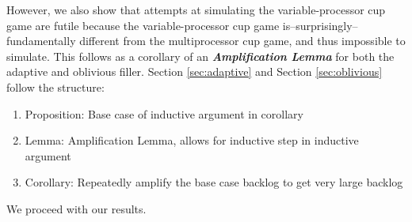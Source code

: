 \documentclass[twocolumn]{article}[11pt]
\newcommand{\defn}[1]{{\textit{\textbf{\boldmath #1}}}}
\begin{document}
However, we also show that attempts at simulating the variable-processor cup
game are futile because the variable-processor cup game
is--surprisingly--fundamentally different from the multiprocessor cup game, and
thus impossible to simulate. This follows as a corollary of an
\defn{Amplification Lemma} for both the adaptive and oblivious filler.
Section \ref{sec:adaptive} and Section \ref{sec:oblivious} follow the structure:
\begin{enumerate}
  \item Proposition: Base case of inductive argument in corollary
  \item Lemma: Amplification Lemma, allows for inductive step in inductive argument
  \item Corollary: Repeatedly amplify the base case backlog to get very large backlog
\end{enumerate}
We proceed with our results.
\end{document}

